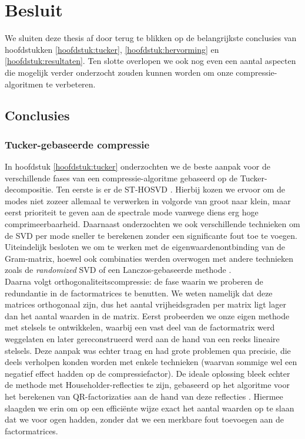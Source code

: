 \chapter{Besluit}
\label{hoofdstuk:besluit}

We sluiten deze thesis af door terug te blikken op de belangrijkste conclusies van hoofdstukken \ref{hoofdstuk:tucker}, \ref{hoofdstuk:hervorming} en \ref{hoofdstuk:resultaten}. Ten slotte overlopen we ook nog even een aantal aspecten die mogelijk verder onderzocht zouden kunnen worden om onze compressie-algoritmen te verbeteren.

\section{Conclusies}

\subsection{Tucker-gebaseerde compressie}

In hoofdstuk \ref{hoofdstuk:tucker} onderzochten we de beste aanpak voor de verschillende fases van een compressie-algoritme gebaseerd op de Tucker-decompositie. Ten eerste is er de ST-HOSVD \cite{ref:st_hosvd}. Hierbij kozen we ervoor om de modes niet zozeer allemaal te verwerken in volgorde van groot naar klein, maar eerst prioriteit te geven aan de spectrale mode vanwege diens erg hoge comprimeerbaarheid. Daarnaast onderzochten we ook verschillende technieken om de SVD per mode sneller te berekenen zonder een significante fout toe te voegen. Uiteindelijk besloten we om te werken met de eigenwaardenontbinding van de Gram-matrix, hoewel ook combinaties werden overwogen met andere technieken zoals de \textit{randomized} SVD \cite{ref:randomized_svd} of een Lanczos-gebaseerde methode \cite{ref:lanczos} \cite{ref:saad}.\\

Daarna volgt orthogonaliteitscompressie: de fase waarin we proberen de redundantie in de factormatrices te benutten. We weten namelijk dat deze matrices orthogonaal zijn, dus het aantal vrijheidsgraden per matrix ligt lager dan het aantal waarden in de matrix. Eerst probeerden we onze eigen methode met stelsels te ontwikkelen, waarbij een vast deel van de factormatrix werd weggelaten en later gereconstrueerd werd aan de hand van een reeks lineaire stelsels. Deze aanpak was echter traag en had grote problemen qua precisie, die deels verholpen konden worden met enkele technieken (waarvan sommige wel een negatief effect hadden op de compressiefactor). De ideale oplossing bleek echter de methode met Householder-reflecties te zijn, gebaseerd op het algoritme voor het berekenen van QR-factorizaties aan de hand van deze reflecties \cite{ref:qr_factorization_householder}. Hiermee slaagden we erin om op een effici\"ente wijze exact het aantal waarden op te slaan dat we voor ogen hadden, zonder dat we een merkbare fout toevoegen aan de factormatrices.\\

